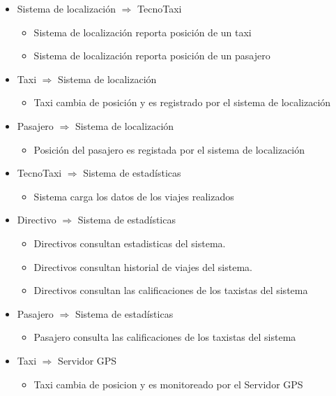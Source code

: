 \begin{itemize}
    \item Sistema de localizaci\'on $\Rightarrow$ TecnoTaxi
    \begin{itemize}
        \item Sistema de localizaci\'on reporta posici\'on de un taxi
        \item Sistema de localizaci\'on reporta posici\'on de un pasajero
        
    \end{itemize}	
        \item Taxi $\Rightarrow$ Sistema de localizaci\'on
  		\begin{itemize}
        \item Taxi cambia de posici\'on y es registrado por el sistema de localizaci\'on
         \end{itemize}	

    \item Pasajero $\Rightarrow$ Sistema de localizaci\'on
    \begin{itemize}
        \item Posici\'on del pasajero es registada por el sistema de localizaci\'on
        \end{itemize}	


    \item TecnoTaxi $\Rightarrow$ Sistema de estad\'isticas
    
     \begin{itemize}
        \item Sistema carga los datos de los viajes realizados
    \end{itemize}	

    \item Directivo $\Rightarrow$ Sistema de estad\'isticas
    \begin{itemize}
        \item Directivos consultan estadisticas del sistema.
        \item Directivos consultan historial de viajes del sistema.
        \item Directivos consultan las calificaciones de los taxistas del sistema
    \end{itemize} 

     \item Pasajero $\Rightarrow$ Sistema de estad\'isticas
    \begin{itemize}
         \item Pasajero consulta las calificaciones de los taxistas del sistema
    \end{itemize}


    \item Taxi $\Rightarrow$ Servidor GPS
    \begin{itemize}
        \item Taxi cambia de posicion y es monitoreado por el Servidor GPS
    \end{itemize} 

\end{itemize}


